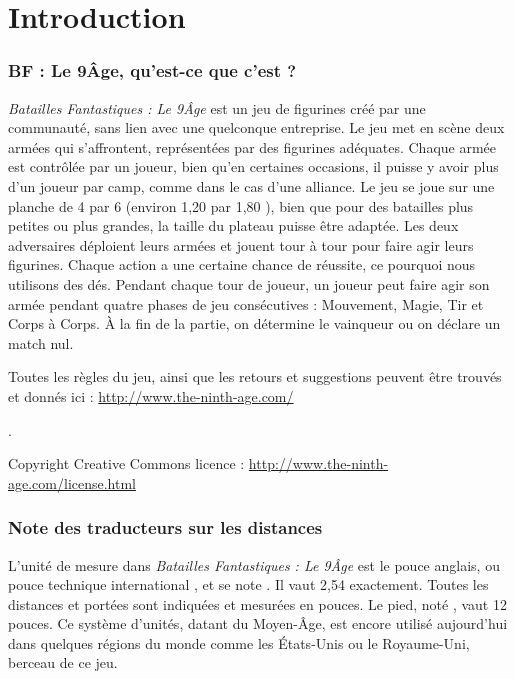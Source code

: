 
\part{Introduction}

\section{BF : Le 9\ieme Âge, qu'est-ce que c'est ?}

\emph{Batailles Fantastiques : Le 9\ieme Âge} est un jeu de figurines créé par une communauté, sans lien avec une quelconque entreprise. Le jeu met en scène deux armées qui s'affrontent, représentées par des figurines adéquates. Chaque armée est contrôlée par un joueur, bien qu'en certaines occasions, il puisse y avoir plus d'un joueur par camp, comme dans le cas d'une alliance. Le jeu se joue sur une planche de 4{\pied} par 6{\pied} (environ 1,20 {\meter} par 1,80 {\meter}), bien que pour des batailles plus petites ou plus grandes, la taille du plateau puisse être adaptée. Les deux adversaires déploient leurs armées et jouent tour à tour pour faire agir leurs figurines. Chaque action a une certaine chance de réussite, ce pourquoi nous utilisons des dés. Pendant chaque tour de joueur, un joueur peut faire agir son armée pendant quatre phases de jeu consécutives : Mouvement, Magie, Tir et Corps à Corps. À la fin de la partie, on détermine le vainqueur ou on déclare un match nul.

Toutes les règles du jeu, ainsi que les retours et suggestions peuvent être trouvés et donnés ici :
\url{http://www.the-ninth-age.com/}

. 

Copyright Creative Commons licence : \url{http://www.the-ninth-age.com/license.html}

\section{Note des traducteurs sur les distances}

L'unité de mesure dans \emph{Batailles Fantastiques : Le 9\ieme Âge} est le pouce anglais, ou \og pouce technique international \fg , et se note \pouce . Il vaut 2,54 {\centi\meter} exactement. Toutes les distances et portées sont indiquées et mesurées en pouces. Le pied, noté \pied , vaut 12 pouces. Ce système d'unités, datant du Moyen-Âge, est encore utilisé aujourd'hui dans quelques régions du monde comme les États-Unis ou le Royaume-Uni, berceau de ce jeu.


